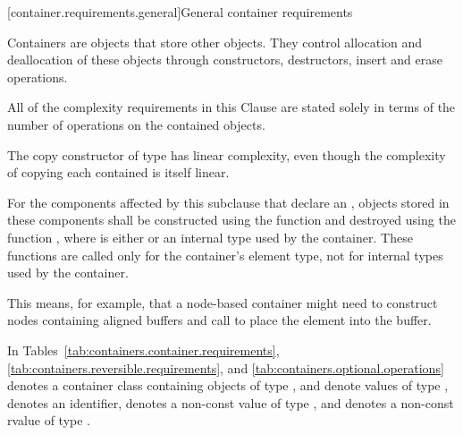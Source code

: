[container.requirements.general]{General container requirements}

\pnum
Containers are objects that store other objects.
They control allocation and deallocation of these objects
through constructors, destructors, insert and erase operations.

\pnum
All of the complexity requirements in this Clause are stated solely
in terms of the number of operations on the contained objects.
\begin{example}
The copy constructor of type
has linear complexity,
even though the complexity of copying each contained
is itself linear.
\end{example}

\pnum
For the components affected by this subclause that declare an ,
objects stored in these components shall be constructed using the function
and destroyed using the function
,
where  is either  or
an internal type used by the container.
These functions are called only for the
container's element type, not for internal types used by the container. \begin{note} This
means, for example, that a node-based container might need to construct nodes containing
aligned buffers and call  to place the element into the buffer.
\end{note}

\pnum
In Tables~\ref{tab:containers.container.requirements},
\ref{tab:containers.reversible.requirements}, and
\ref{tab:containers.optional.operations}
 denotes a container class containing objects of type
,  and 
denote values of type , 
denotes an identifier,  denotes
a non-const value of type , and 
denotes a non-const rvalue of type .

